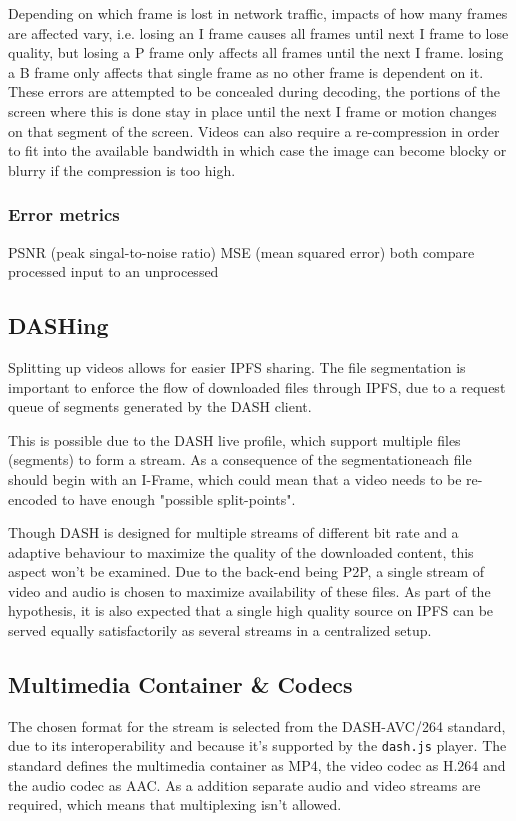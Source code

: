 Depending on which frame is lost in network traffic, impacts of how many frames are affected vary, i.e. losing an I frame causes all frames until next I frame to lose quality, but losing a P frame only affects all frames until the next I frame. losing a B frame only affects that single frame as no other frame is dependent on it.\\
These errors are attempted to be concealed during decoding, the portions of the screen where this is done stay in place until the next I frame or motion changes on that segment of the screen. Videos can also require a re-compression in order to fit into the available bandwidth in which case the image can become blocky or blurry if the compression is too high.

\subsubsection{Error metrics}
PSNR (peak singal-to-noise ratio) MSE (mean squared error) both compare processed input to an unprocessed

\subsection{DASHing}
Splitting up videos allows for easier \acs{IPFS} sharing. The file segmentation is important to enforce the flow of downloaded files through IPFS, due to a request queue of segments generated by the DASH client.

This is possible due to the DASH live profile, which support multiple files (segments) to form a stream. As a consequence of the segmentationeach file should begin with an I-Frame, which could mean that a video needs to be re-encoded to have enough "possible split-points".

Though DASH is designed for multiple streams of different bit rate and a adaptive behaviour to maximize the quality of the downloaded content, this aspect won't be examined. Due to the back-end being \acs{P2P}, a single stream of video and audio is chosen to maximize availability of these files. As part of the hypothesis, it is also expected that a single high quality source on IPFS can be served equally satisfactorily as several streams in a centralized setup.

\subsection{Multimedia Container \& Codecs}
The chosen format for the stream is selected from the DASH-AVC/264 standard\cite{dash264}, due to its interoperability and because it's supported by the \texttt{dash.js} player.
The standard defines the multimedia container as MP4, the video codec as H.264 and the audio codec as AAC. As a addition separate audio and video streams are required, which means that multiplexing isn't allowed.



